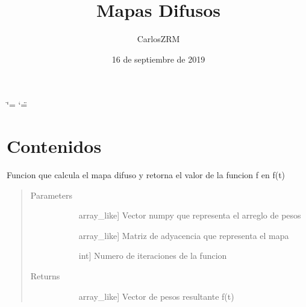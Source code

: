 \documentclass[letterpaper,10pt,spanish]{sphinxmanual}
\title{Mapas Difusos}
\date{16 de septiembre de 2019}
\author{CarlosZRM}
\begin{document}
\ifdefined\shorthandoff
  \ifnum\catcode`\=\string=\active\shorthandoff{=}\fi
  \ifnum\catcode`\"=\active{}\fi
\fi

\pagestyle{empty}
\sphinxmaketitle
\pagestyle{plain}
\sphinxtableofcontents
\pagestyle{normal}
\label{\detokenize{index::doc}}



\chapter{Contenidos}
\label{\detokenize{index:module-fuzzyMap}}\label{\detokenize{index:contenidos}}

\begin{fulllineitems}
\label{\detokenize{index:fuzzyMap.fuzzy}}
Funcion que calcula el mapa difuso y retorna el valor  
de la funcion f en f(t)
\begin{quote}\begin{description}
\item[{Parameters}] \leavevmode\begin{description}
\item[{}] \leavevmode{[}array\_like{]}
Vector numpy que representa el arreglo de pesos

\item[{}] \leavevmode{[}array\_like{]}
Matriz de adyacencia que representa el mapa

\item[{}] \leavevmode{[}int{]}
Numero de iteraciones de la funcion

\end{description}

\item[{Returns}] \leavevmode\begin{description}
\item[{}] \leavevmode{[}array\_like{]}
Vector de pesos resultante f(t)

\end{description}

\end{description}\end{quote}

\end{fulllineitems}
\end{document}
